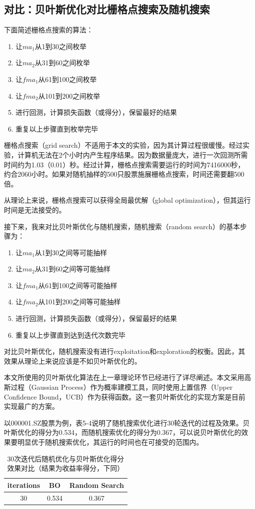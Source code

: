 \documentclass[twoside,longtitle]{LZUthesis}
\begin{document}
\subsection{对比：贝叶斯优化对比栅格点搜索及随机搜索}
下面简述栅格点搜索的算法：
\begin{enumerate}
    \item 让$ma_1$从1到30之间枚举
    \item 让$ma_2$从31到60之间枚举
    \item 让$fma_1$从61到100之间枚举
    \item 让$fma_2$从101到200之间枚举
    \item 进行回测，计算损失函数（或得分），保留最好的结果
    \item 重复以上步骤直到枚举完毕
\end{enumerate}

栅格点搜索（grid search）不适用于本文的实验，因为其计算过程很缓慢。经过实验，计算机无法在2个小时内产生程序结果。因为数据量庞大，进行一次回测所需时间约为1.03（0.01）秒。经过计算，栅格点搜索需要运行的时间为7416000秒，约合2060小时。如果对随机抽样的500只股票施展栅格点搜索，时间还需要翻500倍。

从理论上来说，栅格点搜索可以获得全局最优解（global optimization），但其运行时间是无法接受的。

接下来，我来对比贝叶斯优化与随机搜索，随机搜索（random search）的基本步骤为：
\begin{enumerate}
    \item 让$ma_1$从1到30之间等可能抽样
    \item 让$ma_2$从31到60之间等可能抽样
    \item 让$fma_1$从61到100之间等可能抽样
    \item 让$fma_2$从101到200之间等可能抽样
    \item 进行回测，计算损失函数（或得分），保留最好的结果
    \item 重复以上步骤直到达到迭代次数完毕
\end{enumerate}

对比贝叶斯优化，随机搜索没有进行exploitation和exploration的权衡。因此，其效果从理论上来说应该是不如贝叶斯优化的。

本文所使用的贝叶斯优化算法在上一章理论环节已经进行了详尽阐述。本文采用高斯过程（Gaussian Process）作为概率建模工具，同时使用上置信界（Upper Confidence Bound，UCB）作为获得函数。这一套贝叶斯优化的实现方案是目前实现最广的方案。

以000001.SZ股票为例，表5-4说明了随机搜索优化进行30轮迭代的过程及效果。贝叶斯优化的得分为0.534，而随机搜索优化的得分为0.367，可以说贝叶斯优化的效果要明显优于随机搜索优化，其运行的时间也在可接受的范围内。
\begin{table}[h]
\centering
\begin{tabular}{ccc}
\hline
iterations & BO    & Random Search \\\hline
30         & 0.534 & 0.367        \\\hline
\end{tabular}
\caption{30次迭代后随机优化与贝叶斯优化得分效果对比（结果为收益率得分，下同）}
\label{tab:my-table}
\end{table}
\end{document}
